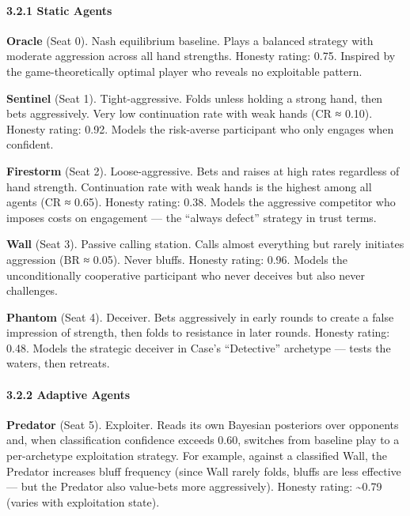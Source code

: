 \documentclass[
]{article}
\begin{document}
\hypertarget{static-agents}{%
\paragraph{3.2.1 Static Agents}\label{static-agents}}

\textbf{Oracle} (Seat 0). Nash equilibrium baseline. Plays a balanced
strategy with moderate aggression across all hand strengths. Honesty
rating: 0.75. Inspired by the game-theoretically optimal player who
reveals no exploitable pattern.

\textbf{Sentinel} (Seat 1). Tight-aggressive. Folds unless holding a
strong hand, then bets aggressively. Very low continuation rate with
weak hands (CR ≈ 0.10). Honesty rating: 0.92. Models the risk-averse
participant who only engages when confident.

\textbf{Firestorm} (Seat 2). Loose-aggressive. Bets and raises at high
rates regardless of hand strength. Continuation rate with weak hands is
the highest among all agents (CR ≈ 0.65). Honesty rating: 0.38. Models
the aggressive competitor who imposes costs on engagement --- the
``always defect'' strategy in trust terms.

\textbf{Wall} (Seat 3). Passive calling station. Calls almost everything
but rarely initiates aggression (BR ≈ 0.05). Never bluffs. Honesty
rating: 0.96. Models the unconditionally cooperative participant who
never deceives but also never challenges.

\textbf{Phantom} (Seat 4). Deceiver. Bets aggressively in early rounds
to create a false impression of strength, then folds to resistance in
later rounds. Honesty rating: 0.48. Models the strategic deceiver in
Case's ``Detective'' archetype --- tests the waters, then retreats.

\hypertarget{adaptive-agents}{%
\paragraph{3.2.2 Adaptive Agents}\label{adaptive-agents}}

\textbf{Predator} (Seat 5). Exploiter. Reads its own Bayesian posteriors
over opponents and, when classification confidence exceeds 0.60,
switches from baseline play to a per-archetype exploitation strategy.
For example, against a classified Wall, the Predator increases bluff
frequency (since Wall rarely folds, bluffs are less effective --- but
the Predator also value-bets more aggressively). Honesty rating:
\textasciitilde0.79 (varies with exploitation state).
\end{document}
